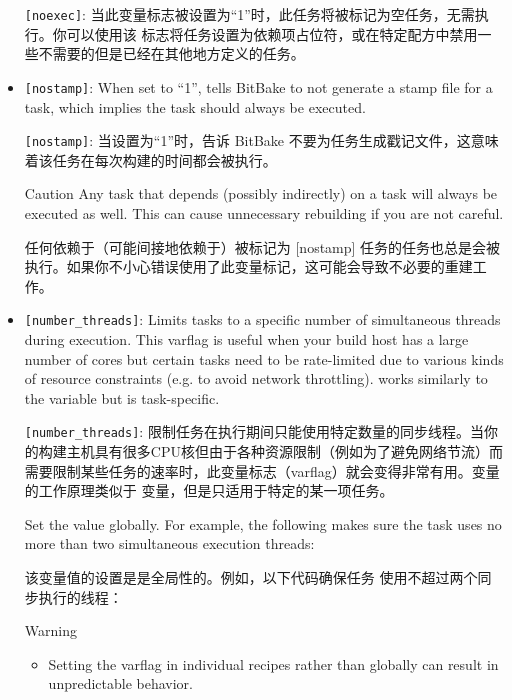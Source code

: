 \begin{itemize}
\medskip
\texttt{[noexec]}: 当此变量标志被设置为“1”时，此任务将被标记为空任务，无需执行。你可以使用该 \code{[noexec]} 标志将任务设置为依赖项占位符，或在特定配方中禁用一些不需要的但是已经在其他地方定义的任务。

\item \texttt{[nostamp]}: When set to ``1'', tells BitBake to not generate a stamp file for a task, which implies the task should always be executed.

\medskip
\texttt{[nostamp]}: 当设置为“1”时，告诉 BitBake 不要为任务生成戳记文件，这意味着该任务在每次构建的时间都会被执行。

\medskip
\begin{noteblock}{Caution}%
Any task that depends (possibly indirectly) on a \code{[nostamp]} task will always be executed as well. This can cause unnecessary rebuilding if you are not careful.

\medskip
任何依赖于（可能间接地依赖于）被标记为 [nostamp] 任务的任务也总是会被执行。如果你不小心错误使用了此变量标记，这可能会导致不必要的重建工作。
\end{noteblock}

\item \texttt{[number\_threads]}: Limits tasks to a specific number of simultaneous threads during execution. This varflag is useful when your build host has a large number of cores but certain tasks need to be rate-limited due to various kinds of resource constraints (e.g. to avoid network throttling).  works similarly to the  variable but is task-specific.

\medskip
\texttt{[number\_threads]}: 限制任务在执行期间只能使用特定数量的同步线程。当你的构建主机具有很多CPU核但由于各种资源限制（例如为了避免网络节流）而需要限制某些任务的速率时，此变量标志（varflag）就会变得非常有用。变量  的工作原理类似于  变量，但是只适用于特定的某一项任务。

\medskip
Set the value globally. For example, the following makes sure the  task uses no more than two simultaneous execution threads: 

\medskip
该变量值的设置是是全局性的。例如，以下代码确保任务  使用不超过两个同步执行的线程：

\medskip
\begin{noteblock}{Warning}%
\begin{itemize}
\setlength\itemsep{1.0em}
\item Setting the varflag in individual recipes rather than globally can result in unpredictable behavior.


\end{itemize}
\end{noteblock}
\end{itemize}
